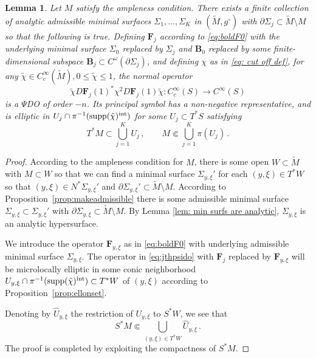 \documentclass[11pt]{amsart}
\newtheorem{Lemma}[Theorem]{Lemma}
\theoremstyle{definition}
\numberwithin{equation}{section}
\newcommand{\supp}{\mathrm{supp}}
\newcommand{\p}{\partial}
\newcommand{\BB}{\mathbf B}
\begin{document}
\begin{Lemma}\label{lem:findfiniteminsurfs}
    Let $M$ satisfy the ampleness condition. 
    There exists a finite collection of analytic admissible minimal surfaces $\Sigma_1,\dots,\Sigma_K$ in $(\widetilde{M},g^\circ)$ with $\p\Sigma_j\subset \widetilde{M}\setminus M$ so that the following is true. Defining $\mathbf{F}_j$ according to \eqref{eq:boldF0} with the underlying minimal surface $\Sigma_0$ replaced by $\Sigma_j$ and $\BB_0$ replaced by some finite-dimensional subspace $\BB_j \subset C^\omega(\p\Sigma_j)$, and defining $\chi$ as in \eqref{eq: cut off def}, for any $\tilde{\chi}\in C_c^\infty(\widetilde{M}), 0\leq \tilde{\chi}\leq 1$, the normal operator 
    \begin{equation}\label{eq:jthpsido}
        \tilde{\chi}D\mathbf{F}_j(1)^\ast \chi^2 D\mathbf{F}_j(1)\tilde{\chi}\colon C_c^\infty(S) \to C^\infty(S)
    \end{equation}
    is a $\Psi$DO of order $-n$. Its principal symbol has a non-negative representative, and is elliptic in $U_j\cap \pi^{-1}(\supp(\tilde{\chi})^{\rm int})$ for some $U_j\subset T^\ast S$ satisfying
    \begin{equation}
    \label{eq: covers everything}
     T^*{M} \subset\bigcup\limits_{j=1}^K U_j\,,\qquad M\Subset \bigcup\limits_{j=1}^K \pi(U_j)\,.
    \end{equation}
\end{Lemma}
\begin{proof}
    According to the ampleness condition for $M$, there is some open $W\subset \widetilde{M}$ with $M\subset W$ so that we can find a minimal surface $\Sigma_{y,\xi}'$ for each $(y,\xi)\in T^\ast W$ so that $(y,\xi)\in N^\ast \Sigma_{y,\xi}'$ and $\p\Sigma_{y,\xi}'\subset \widetilde{M}\setminus M$. According to Proposition~\ref{prop:makeadmissible} there is some admissible minimal surface $\Sigma_{y,\xi}\subset \Sigma_{y,\xi}'$ with $\p \Sigma_{y,\xi}\subset \widetilde{M}\setminus M$. By Lemma \ref{lem: min surfs are analytic}, $\Sigma_{y,\xi}$ is an analytic hypersurface.
    
    We introduce the operator $\mathbf{F}_{y,\xi}$ as in \eqref{eq:boldF0} with underlying admissible minimal surface $\Sigma_{y,\xi}$. The operator in \eqref{eq:jthpsido} with $\mathbf{F}_j$ replaced by $\mathbf{F}_{y,\xi}$ will be microlocally elliptic in some conic neighborhood $U_{y,\xi} \cap \pi^{-1}(\supp(\tilde{\chi})^{\rm int}) \subset T^\ast W$ of $(y,\xi)$ according to Proposition~\ref{prop:ellonset}. 

    Denoting by $\hat U_{y,\xi}$ the restriction of $U_{y,\xi}$ to $S^\ast W$, we see that 
    \[
        S^\ast M \Subset \bigcup_{(y,\xi)\in T^\ast W} \hat U_{y,\xi}\,.
    \]
    The proof is completed by exploiting the compactness of $S^\ast M$.
\end{proof}
\end{document}
